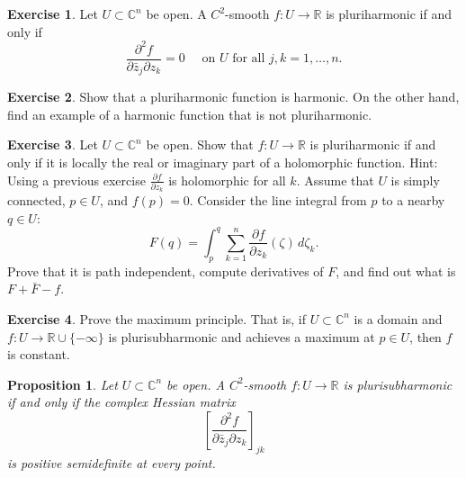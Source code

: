 \documentclass[12pt,openany]{book}
\newcommand{\C}{{\mathbb{C}}}
\newcommand{\R}{{\mathbb{R}}}
\theoremstyle{plain}
\newtheorem{prop}[thm]{Proposition}
\theoremstyle{remark}
\theoremstyle{definition}
\newenvironment{exbox}{%
    \def\FrameCommand{\vrule width 1pt \relax\hspace{10pt}}%
    \MakeFramed {\advance \hsize -\width \FrameRestore}%
}{%
    \endMakeFramed
}
\theoremstyle{exercise}
\newtheorem{exercise}{Exercise}[section]
\theoremstyle{example}
\begin{document}
\begin{exbox}
\begin{exercise}
Let $U \subset \C^n$ be open.
A $C^2$-smooth $f \colon U \to \R$ is pluriharmonic if and
only if
\begin{equation*}
\frac{\partial^2 f}{\partial \bar{z}_j \partial z_k} = 0
\quad \text{ on $U$ for all $j,k=1,\ldots,n$.}
\end{equation*}
\end{exercise}

\begin{exercise}
Show that a pluriharmonic function is harmonic.  On the other hand, find an
example of a harmonic function that is not pluriharmonic.
\end{exercise}

\begin{exercise}
Let $U \subset \C^n$ be open.
Show that $f \colon U \to \R$ is pluriharmonic if and
only if it is locally the real or imaginary part of a holomorphic function.
Hint:  Using a previous exercise
$\frac{\partial f}{\partial z_k}$ is holomorphic for all $k$.
Assume that $U$ is simply connected, $p \in U$, and
$f(p) = 0$.
Consider the line integral from $p$ to a nearby $q \in U$:
\begin{equation*}
F(q) =
\int_{p}^q \sum_{k=1}^n
\frac{\partial f}{\partial z_k}(\zeta) \, d\zeta_k .
\end{equation*}
Prove that it is path independent, compute derivatives of $F$, and
find out what is $F+\bar{F}-f$.
\end{exercise}

\begin{exercise}
Prove the maximum principle.
That is, if $U \subset \C^n$ is a domain and $f \colon U \to \R \cup
\{-\infty\}$ is
plurisubharmonic and achieves a maximum at $p \in U$, then $f$ is constant.
\end{exercise}
\end{exbox}

\begin{samepage}
\begin{prop}
Let $U \subset \C^n$ be open.
A $C^2$-smooth $f \colon U \to \R$ is plurisubharmonic
if and only if the complex Hessian matrix
\begin{equation*}
\left[
\frac{\partial^2 f}{\partial \bar{z}_j \partial z_k}
\right]_{jk}
\end{equation*}
is positive semidefinite at every
point.
\end{prop}
\end{samepage}
\end{document}
